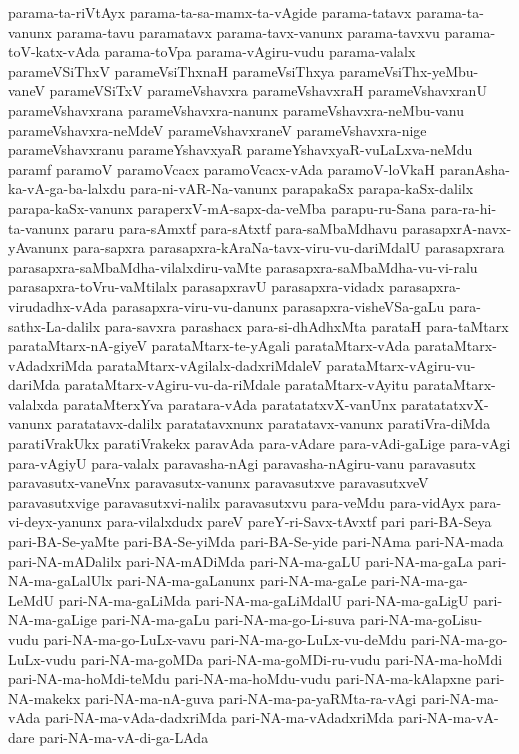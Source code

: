 {parama-ta-riVtAyx
parama-ta-sa-mamx-ta-vAgide
parama-tatavx
parama-ta-vanunx
parama-tavu
paramatavx
parama-tavx-vanunx
parama-tavxvu
parama-toV-katx-vAda
parama-toVpa
parama-vAgiru-vudu
parama-valalx
parameVSiThxV
parameVsiThxnaH
parameVsiThxya
parameVsiThx-yeMbu-vaneV
parameVSiTxV
parameVshavxra
parameVshavxraH
parameVshavxranU
parameVshavxrana
parameVshavxra-nanunx
parameVshavxra-neMbu-vanu
parameVshavxra-neMdeV
parameVshavxraneV
parameVshavxra-nige
parameVshavxranu
parameYshavxyaR
parameYshavxyaR-vuLaLxva-neMdu
paramf
paramoV
paramoVcacx
paramoVcacx-vAda
paramoV-loVkaH
paranAsha-ka-vA-ga-ba-lalxdu
para-ni-vAR-Na-vanunx
parapakaSx
parapa-kaSx-dalilx
parapa-kaSx-vanunx
paraperxV-mA-sapx-da-veMba
parapu-ru-Sana
para-ra-hi-ta-vanunx
pararu
para-sAmxtf
para-sAtxtf
para-saMbaMdhavu
parasapxrA-navx-yAvanunx
para-sapxra
parasapxra-kAraNa-tavx-viru-vu-dariMdalU
parasapxrara
parasapxra-saMbaMdha-vilalxdiru-vaMte
parasapxra-saMbaMdha-vu-vi-ralu
parasapxra-toVru-vaMtilalx
parasapxravU
parasapxra-vidadx
parasapxra-virudadhx-vAda
parasapxra-viru-vu-danunx
parasapxra-visheVSa-gaLu
para-sathx-La-dalilx
para-savxra
parashacx
para-si-dhAdhxMta
parataH
para-taMtarx
parataMtarx-nA-giyeV
parataMtarx-te-yAgali
parataMtarx-vAda
parataMtarx-vAdadxriMda
parataMtarx-vAgilalx-dadxriMdaleV
parataMtarx-vAgiru-vu-dariMda
parataMtarx-vAgiru-vu-da-riMdale
parataMtarx-vAyitu
parataMtarx-valalxda
parataMterxYva
paratara-vAda
paratatatxvX-vanUnx
paratatatxvX-vanunx
paratatavx-dalilx
paratatavxnunx
paratatavx-vanunx
paratiVra-diMda
paratiVrakUkx
paratiVrakekx
paravAda
para-vAdare
para-vAdi-gaLige
para-vAgi
para-vAgiyU
para-valalx
paravasha-nAgi
paravasha-nAgiru-vanu
paravasutx
paravasutx-vaneVnx
paravasutx-vanunx
paravasutxve
paravasutxveV
paravasutxvige
paravasutxvi-nalilx
paravasutxvu
para-veMdu
para-vidAyx
para-vi-deyx-yanunx
para-vilalxdudx
pareV
pareY-ri-Savx-tAvxtf
pari
pari-BA-Seya
pari-BA-Se-yaMte
pari-BA-Se-yiMda
pari-BA-Se-yide
pari-NAma
pari-NA-mada
pari-NA-mADalilx
pari-NA-mADiMda
pari-NA-ma-gaLU
pari-NA-ma-gaLa
pari-NA-ma-gaLalUlx
pari-NA-ma-gaLanunx
pari-NA-ma-gaLe
pari-NA-ma-ga-LeMdU
pari-NA-ma-gaLiMda
pari-NA-ma-gaLiMdalU
pari-NA-ma-gaLigU
pari-NA-ma-gaLige
pari-NA-ma-gaLu
pari-NA-ma-go-Li-suva
pari-NA-ma-goLisu-vudu
pari-NA-ma-go-LuLx-vavu
pari-NA-ma-go-LuLx-vu-deMdu
pari-NA-ma-go-LuLx-vudu
pari-NA-ma-goMDa
pari-NA-ma-goMDi-ru-vudu
pari-NA-ma-hoMdi
pari-NA-ma-hoMdi-teMdu
pari-NA-ma-hoMdu-vudu
pari-NA-ma-kAlapxne
pari-NA-makekx
pari-NA-ma-nA-guva
pari-NA-ma-pa-yaRMta-ra-vAgi
pari-NA-ma-vAda
pari-NA-ma-vAda-dadxriMda
pari-NA-ma-vAdadxriMda
pari-NA-ma-vA-dare
pari-NA-ma-vA-di-ga-LAda
}

